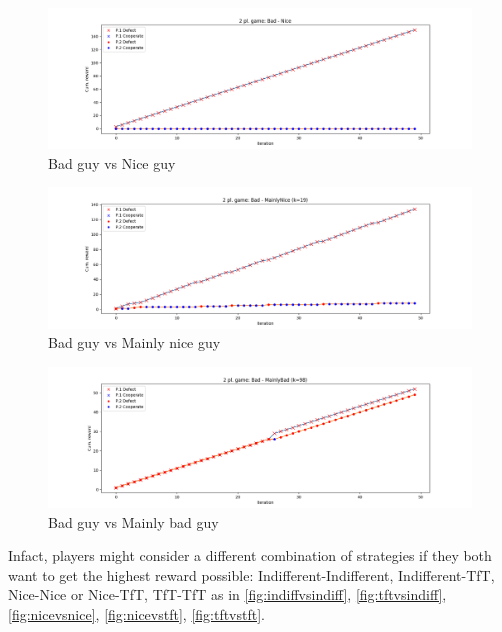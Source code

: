 \documentclass[journal,a4paper,10pt,twoside]{IEEEtran}
\begin{document}
\begin{figure}
    \centering
    \includegraphics[width=1\columnwidth]{../img_v1/idp2p-rewards-Bad-Nice.png}
    \caption{Bad guy vs Nice guy}
    \label{fig:badvsnice}
\end{figure}

\begin{figure}
    \centering
    \includegraphics[width=1\columnwidth]{../img_v1/idp2p-rewards-Bad-MainlyNice (k=19).png}
    \caption{Bad guy vs Mainly nice guy}
    \label{fig:badvsmainlynice}
\end{figure}

\begin{figure}
    \centering
    \includegraphics[width=1\columnwidth]{../img_v1/idp2p-rewards-Bad-MainlyBad (k=98).png}
    \caption{Bad guy vs Mainly bad guy}
    \label{fig:badvsmainlybad}
\end{figure}

Infact, players might consider a different combination of strategies if they both want to get the highest reward possible: Indifferent-Indifferent, Indifferent-TfT, Nice-Nice or Nice-TfT, TfT-TfT as in \autoref{fig:indiffvsindiff}, \autoref{fig:tftvsindiff}, \autoref{fig:nicevsnice}, \autoref{fig:nicevstft}, \autoref{fig:tftvstft}.
\end{document}

